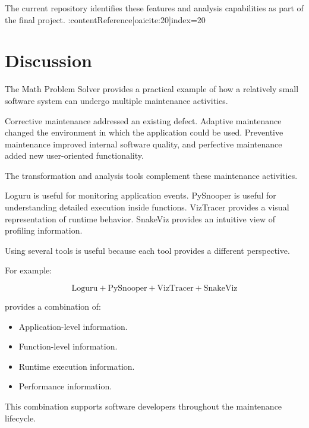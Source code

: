 \documentclass[12pt,a4paper]{report}
\begin{document}
The current repository identifies these features and analysis
capabilities as part of the final project. :contentReference[oaicite:20]{index=20}


\chapter{Discussion}

The Math Problem Solver provides a practical example of how a
relatively small software system can undergo multiple maintenance
activities.

Corrective maintenance addressed an existing defect. Adaptive
maintenance changed the environment in which the application could be
used. Preventive maintenance improved internal software quality, and
perfective maintenance added new user-oriented functionality.

The transformation and analysis tools complement these maintenance
activities.

Loguru is useful for monitoring application events. PySnooper is
useful for understanding detailed execution inside functions.
VizTracer provides a visual representation of runtime behavior.
SnakeViz provides an intuitive view of profiling information.

Using several tools is useful because each tool provides a different
perspective.

For example:

\[
\text{Loguru}
+
\text{PySnooper}
+
\text{VizTracer}
+
\text{SnakeViz}
\]

provides a combination of:

\begin{itemize}
    \item Application-level information.
    \item Function-level information.
    \item Runtime execution information.
    \item Performance information.
\end{itemize}

This combination supports software developers throughout the
maintenance lifecycle.

\end{document}

